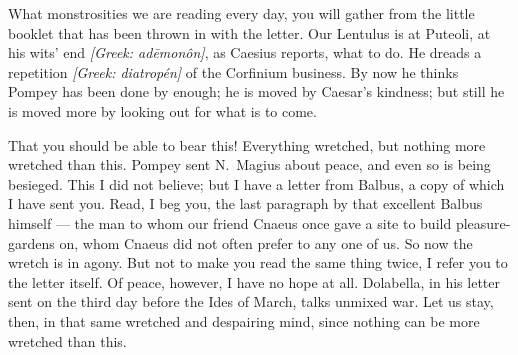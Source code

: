  What monstrosities we are reading every day, you will gather from the little booklet that has been thrown in with the letter. Our Lentulus is at Puteoli, at his wits' end \textit{[Greek: ad\=emon\^on]}, as Caesius reports, what to do. He dreads a repetition \textit{[Greek: diatrop\'en]} of the Corfinium business. By now he thinks Pompey has been done by enough; he is moved by Caesar's kindness; but still he is moved more by looking out for what is to come.

 That you should be able to bear this! Everything wretched, but nothing more wretched than this. Pompey sent N.\ Magius about peace, and even so is being besieged. This I did not believe; but I have a letter from Balbus, a copy of which I have sent you. Read, I beg you, the last paragraph by that excellent Balbus himself --- the man to whom our friend Cnaeus once gave a site to build pleasure-gardens on, whom Cnaeus did not often prefer to any one of us. So now the wretch is in agony. But not to make you read the same thing twice, I refer you to the letter itself. Of peace, however, I have no hope at all. Dolabella, in his letter sent on the third day before the Ides of March, talks unmixed war. Let us stay, then, in that same wretched and despairing mind, since nothing can be more wretched than this.
